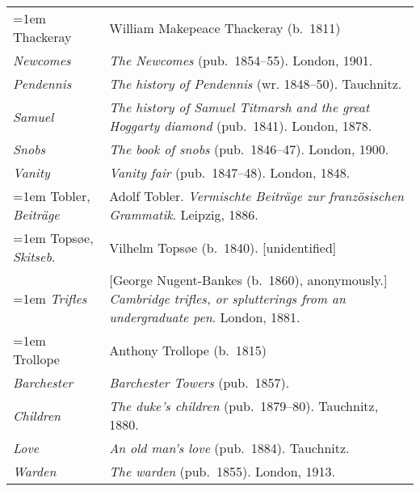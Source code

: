 \begin{xltabular}{\textwidth}{ lQ }
\hangindent=1em  Thackeray & William Makepeace Thackeray (b.~1811) \\
\hspace{1em}\textit{Newcomes} & \textit{The Newcomes} (pub.~1854--55). London, 1901. \\
\hspace{1em}\textit{Pendennis} & \textit{The history of Pendennis} (wr. 1848--50). Tauchnitz. \\
\hspace{1em}\textit{Samuel} & \textit{The history of Samuel Titmarsh and the great Hoggarty diamond} (pub.~1841). London, 1878. \\
\hspace{1em}\textit{Snobs} & \textit{The book of snobs} (pub.~1846--47). London, 1900. \\
\hspace{1em}\textit{Vanity} & \textit{Vanity fair} (pub.~1847--48). London, 1848. \\

\hangindent=1em  Tobler, \textit{Beiträge} & Adolf Tobler. \textit{Vermischte Beiträge zur französischen Grammatik}. Leipzig, 1886. \\ %

\hangindent=1em  Topsøe, \textit{Skitseb}. & Vilhelm Topsøe (b.~1840). [unidentified] \\ %

\hangindent=1em  \textit{Trifles} & [George Nugent-Bankes (b.~1860), anonymously.] \textit{Cambridge trifles, or splutterings from an undergraduate pen}. London, 1881. \\ 

\hangindent=1em  Trollope & Anthony Trollope (b.~1815) \\
\hspace{1em}\textit{Barchester} & \textit{Barchester Towers} (pub.~1857). \\
\hspace{1em}\textit{Children} & \textit{The duke's children} (pub.~1879--80). Tauchnitz, 1880.  \\
\hspace{1em}\textit{Love} & \textit{An old man's love} (pub.~1884). Tauchnitz. \\
\hspace{1em}\textit{Warden} & \textit{The warden} (pub.~1855). London, 1913. \\


\end{xltabular}
